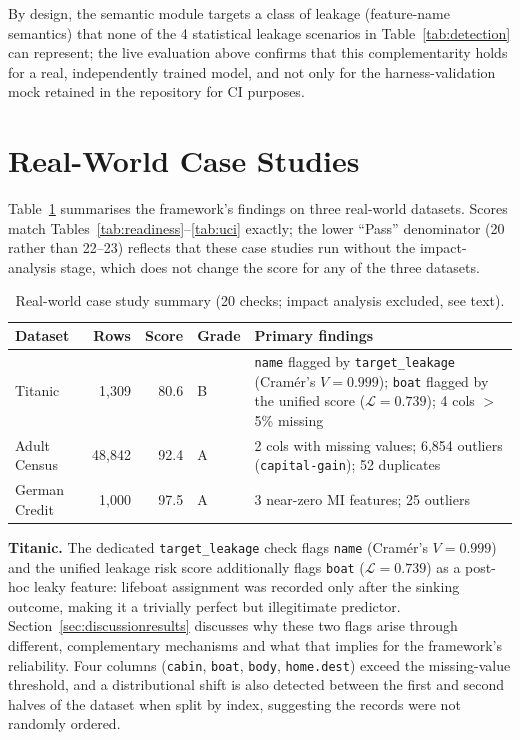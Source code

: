 \documentclass[12pt,a4paper]{report}
\newcommand{\tblhead}{\rowcolor{tblHeadBg}\color{white}\bfseries}
\begin{document}
By design, the semantic module targets a class of leakage (feature-name semantics) that
none of the 4 statistical leakage scenarios in Table~\ref{tab:detection} can represent; the
live evaluation above confirms that this complementarity holds for a real, independently
trained model, and not only for the harness-validation mock retained in the repository for
CI purposes.

\section{Real-World Case Studies}
\label{sec:casestudies}

Table~\ref{tab:casestudies} summarises the framework's findings on three real-world
datasets.  Scores match Tables~\ref{tab:readiness}--\ref{tab:uci} exactly; the lower
``Pass'' denominator (20 rather than 22--23) reflects that these case studies run without
the impact-analysis stage, which does not change the score for any of the three datasets.

\begin{table}[!ht]
\centering
\caption{Real-world case study summary (20 checks; impact analysis excluded, see text).}
\label{tab:casestudies}
\begin{tabularx}{\textwidth}{lrrlX}
\toprule
\tblhead \textbf{Dataset} & \textbf{Rows} & \textbf{Score} & \textbf{Grade} & \textbf{Primary findings} \\
\midrule
Titanic        & 1,309  & 80.6 & B & \texttt{name} flagged by \texttt{target\_leakage} (Cram\'er's $V{=}0.999$); \texttt{boat} flagged by the unified score ($\mathcal{L}{=}0.739$); 4 cols $>$5\% missing \\
Adult Census   & 48,842 & 92.4 & A & 2 cols with missing values; 6,854 outliers (\texttt{capital-gain}); 52 duplicates \\
German Credit  & 1,000  & 97.5 & A & 3 near-zero MI features; 25 outliers \\
\bottomrule
\end{tabularx}
\end{table}

\textbf{Titanic.}  The dedicated \texttt{target\_leakage} check flags \texttt{name}
(Cram\'er's $V{=}0.999$) and the unified leakage risk score additionally flags
\texttt{boat} ($\mathcal{L}{=}0.739$) as a post-hoc leaky feature: lifeboat assignment was
recorded only after the sinking outcome, making it a trivially perfect but illegitimate
predictor.  Section~\ref{sec:discussionresults} discusses why these two flags arise through
different, complementary mechanisms and what that implies for the framework's reliability.
Four columns (\texttt{cabin}, \texttt{boat}, \texttt{body}, \texttt{home.dest}) exceed the
missing-value threshold, and a distributional shift is also detected between the first and
second halves of the dataset when split by index, suggesting the records were not randomly
ordered.
\end{document}
